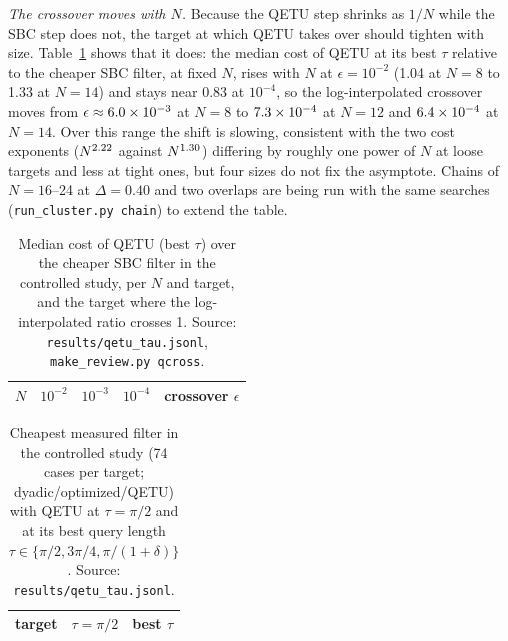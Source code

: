 \documentclass[aps,pra,twocolumn,superscriptaddress,nofootinbib]{revtex4-2}
\begin{document}
\emph{The crossover moves with $N$.} Because the QETU step shrinks as $1/N$ while the SBC step does not, the target at
which QETU takes over should tighten with size. Table~\ref{tab:qcross} shows that it does: the median cost of QETU at
its best $\tau$ relative to the cheaper SBC filter, at fixed $N$, rises with $N$ at $\epsilon=10^{-2}$ (1.04 at $N=8$ to
1.33 at $N=14$) and stays near 0.83 at $10^{-4}$, so the log-interpolated crossover moves from $\epsilon\approx6.0\times10^{-3}$
at $N=8$ to $7.3\times10^{-4}$ at $N=12$ and $6.4\times10^{-4}$ at $N=14$. Over this range the shift is slowing, consistent with
the two cost exponents ($N^{2.22}$ against $N^{1.30}$) differing by roughly one power of $N$ at loose targets and
less at tight ones, but four sizes do not fix the asymptote. Chains of $N=16$--24 at $\Delta=0.40$ and two overlaps
are being run with the same searches (\texttt{run\_cluster.py chain}) to extend the table.

\begin{table}[t]
\caption{Median cost of QETU (best $\tau$) over the cheaper SBC filter in the controlled study, per $N$ and target, and
the target where the log-interpolated ratio crosses 1. Source: \texttt{results/qetu\_tau.jsonl},
\texttt{make\_review.py qcross}.}
\label{tab:qcross}
\begin{ruledtabular}
\begin{tabular}{lrrrr}
$N$ & $10^{-2}$ & $10^{-3}$ & $10^{-4}$ & crossover $\epsilon$\\
\midrule

\end{tabular}
\end{ruledtabular}
\end{table}

\begin{table}[t]
\caption{Cheapest measured filter in the controlled study (74 cases per target; dyadic/optimized/QETU) with QETU at
$\tau=\pi/2$ and at its best query length $\tau\in\{\pi/2,3\pi/4,\pi/(1+\delta)\}$. Source:
\texttt{results/qetu\_tau.jsonl}.}
\label{tab:qetutau}
\begin{ruledtabular}
\begin{tabular}{lll}
target & $\tau=\pi/2$ & best $\tau$\\
\midrule

\end{tabular}
\end{ruledtabular}
\end{table}

\end{document}
